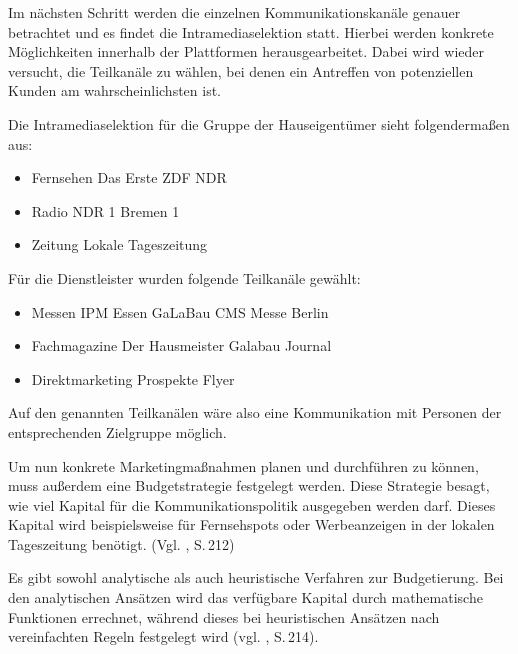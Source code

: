     \noindent
    Im nächsten Schritt werden die einzelnen Kommunikationskanäle genauer betrachtet und es findet die
    Intramediaselektion statt. Hierbei werden konkrete Möglichkeiten innerhalb der Plattformen herausgearbeitet. Dabei
    wird wieder versucht, die Teilkanäle zu wählen, bei denen ein Antreffen von potenziellen Kunden am
    wahrscheinlichsten ist.

    \noindent
    Die Intramediaselektion für die Gruppe der Hauseigentümer sieht folgendermaßen aus:

    \begin{itemize}
        \item Fernsehen
            \subitem Das Erste
            \subitem ZDF
            \subitem NDR
        \item Radio
            \subitem NDR 1
            \subitem Bremen 1
        \item Zeitung
            \subitem Lokale Tageszeitung
    \end{itemize}

    \noindent
    Für die Dienstleister wurden folgende Teilkanäle gewählt:

     \begin{itemize}
        \item Messen
            \subitem IPM Essen
            \subitem GaLaBau
            \subitem CMS Messe Berlin
        
        \item Fachmagazine
            \subitem Der Hausmeister
            \subitem Galabau Journal

        \item Direktmarketing
            \subitem Prospekte
            \subitem Flyer
     \end{itemize}

    \noindent
    Auf den genannten Teilkanälen wäre also eine Kommunikation mit Personen der entsprechenden Zielgruppe möglich.

    \noindent
    Um nun konkrete Marketingmaßnahmen planen und durchführen zu können, muss außerdem eine Budgetstrategie festgelegt
    werden. Diese Strategie besagt, wie viel Kapital für die Kommunikationspolitik ausgegeben werden darf. Dieses
    Kapital wird beispielsweise für Fernsehspots oder Werbeanzeigen in der lokalen Tageszeitung benötigt.
    (Vgl. \cite{Brun2014}, S.\,212)

    \noindent
    Es gibt sowohl analytische als auch heuristische Verfahren zur Budgetierung. Bei den analytischen Ansätzen wird das
    verfügbare Kapital durch mathematische Funktionen errechnet, während dieses bei heuristischen Ansätzen nach
    vereinfachten Regeln festgelegt wird (vgl. \cite{Brun2014}, S.\,214).

